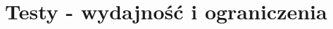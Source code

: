 \chapter{Testy - wydajność i ograniczenia}
	\begin{comment}
		Testy:
			- Porównanie dla trybu "Natywnego", "URM::Core", "URM::Engine".
			- Porównanie złożoności kodu.
			1) Wydajność przetwarzania wierzchołków.
				* Testy wyświetlania obiektów o bardzo złożonej topologii.
				- Oszacowanie maksymalnej ilości wierzchołków.
				- Sprawdzenie narzutu na CPU i GPU.
				+ Optymalizacje vertex shader'a.
				
			2) Wydajność generowania oświetlenia
				* Sprawdzenie narzutu wydajności wielu źródeł światła.
				- Oszacowanie maksymalnego limitu ilości świateł w scenie.
				+ Dodanie bardziej zaawansowanego silnika obliczania efektów oświetlenia.
				
			3) Testy wydajności pixel shader'a.
				- Sprawdzenia skalowania wydajności zależnie od rozdzielczości.
				- Sprawdzenie bottleneck'u (CPU / GPU).
				
			4) Instance rendering.
				- Sprawdzenie jak moduł radzi sobie z rysowaniem wielu instancji tego samego lub różnych obiektów.
				- Porównanie wydajności z różnymi shader'ami i tym samym shader'em.
				
			5) Wydajność wczytywania modeli z pliku.
				- Porównanie różnych formatów.
				- Porównanie różnych opcji preprocessingu.
				- Porównanie pierwszego i kolejnych wczytań modelu (AssetManager).
				
			6) Testy wydajności macierzy transformacji w Transform.
				- Określenie złożoności obliczeniowej poszczególnych funkcji.
				- Oszacowanie maksymalnej głębokości oraz szerokości drzewa obiektów.
				- Sprawdzenie narzutu wielokrotnego ustalania pozycji.
				+ Cache'ing.
				
	\end{comment}